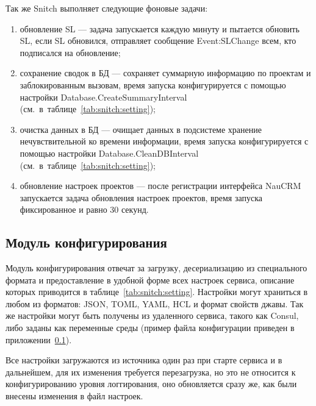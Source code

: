Так же Snitch выполняет следующие фоновые задачи:
\begin{enumerate} %
    \item обновление SL --- задача запускается каждую минуту и пытается обновить SL,
    если SL обновился, отправляет сообщение Event:SLChange всем, кто подписался на обновление;
    \item сохранение сводок в БД --- сохраняет суммарную информацию по проектам и заблокированным вызовам,
    время запуска конфигурируется с помощью настройки Database.CreateSummaryInterval (см.~в~таблице~\ref{tab:snitch:setting}); %
    \item очистка данных в БД --- очищает данных в подсистеме хранение нечувствительной ко времени информации,
    время запуска конфигурируется с помощью настройки Database.CleanDBInterval (см.~в~таблице~\ref{tab:snitch:setting});
    \item обновление настроек проектов --- после регистрации интерфейса NauCRM запускается задача обновления настроек проектов,
    время запуска фиксированное и равно 30 секунд.
\end{enumerate}

\subsection{Модуль конфигурирования}

Модуль конфигурирования отвечат за загрузку, десериализацию из специального формата
и предоставление в удобной форме всех настроек сервиса, описание которых приводится в таблице~\ref{tab:snitch:setting}.
Настройки могут храниться в любом из форматов: JSON, TOML, YAML, HCL и формат свойств джавы.
Так же настройки могут быть получены из удаленного сервиса, такого как Consul\@,
либо заданы как переменные среды (пример файла конфигурации приведен в приложении~\ref{}).

Все настройки загружаются из источника один раз при старте сервиса и в дальнейшем,
для их изменения требуется перезагрузка,
но это не относится к конфигурированию уровня логгирования,
оно обновляется сразу же, как были внесены изменения в файл настроек.

